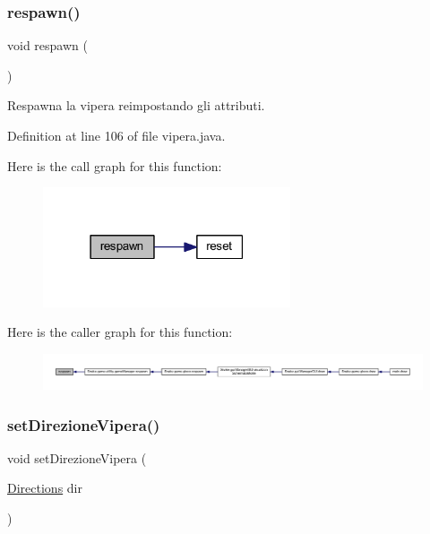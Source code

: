 \subsubsection{\texorpdfstring{respawn()}{respawn()}}
{\footnotesize\ttfamily void respawn (\begin{DoxyParamCaption}{ }\end{DoxyParamCaption})}



Respawna la vipera reimpostando gli attributi. 



Definition at line 106 of file vipera.\+java.

Here is the call graph for this function\+:
\nopagebreak
\begin{figure}[H]
\begin{center}
\leavevmode
\includegraphics[width=207pt]{class_snake_1_1game_1_1vipera_1_1vipera_ac578ca44493fe34e6cb1b2093cf79341_cgraph}
\end{center}
\end{figure}
Here is the caller graph for this function\+:
\nopagebreak
\begin{figure}[H]
\begin{center}
\leavevmode
\includegraphics[width=350pt]{class_snake_1_1game_1_1vipera_1_1vipera_ac578ca44493fe34e6cb1b2093cf79341_icgraph}
\end{center}
\end{figure}
\mbox{\label{class_snake_1_1game_1_1vipera_1_1vipera_a6007259ace9d33bd56b9a6193e86df39}} 
\subsubsection{\texorpdfstring{set\+Direzione\+Vipera()}{setDirezioneVipera()}}
{\footnotesize\ttfamily void set\+Direzione\+Vipera (\begin{DoxyParamCaption}\item[{\mbox{\hyperlink{enum_snake_1_1game_1_1utility_1_1_directions}{Directions}}}]{dir }\end{DoxyParamCaption})}



